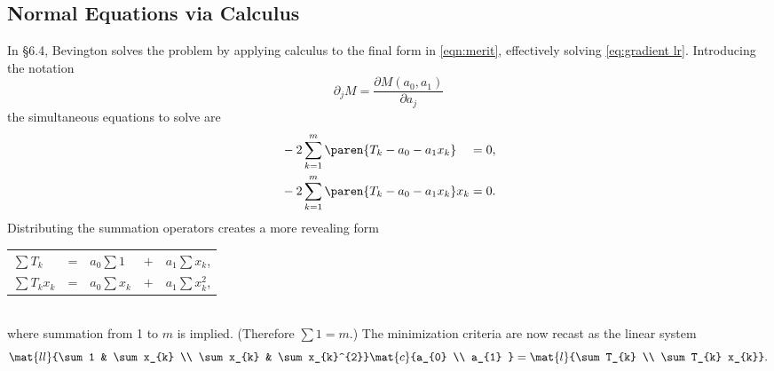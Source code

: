 \subsection{\label{ssec:Normal Equations via Calculus}Normal Equations via Calculus}  %
In \S 6.4, Bevington solves the problem by applying calculus to the final form in \eqref{eqn:merit}, effectively solving \eqref{eq:gradient lr}. Introducing the notation
  \begin{equation*}   %
       \partial_{j} M = \frac{\partial M(a_{0}, a_{1})}{\partial a_{j}}
  \end{equation*}
the simultaneous equations to solve are
\begin{equation*}
  \begin{split}
    &-2 \sum_{k=1}^{m} \paren{T_{k} - a_{0} - a_{1}x_{k}} \phantom{x_{k}} = 0, \\
    &-2 \sum_{k=1}^{m} \paren{T_{k} - a_{0} - a_{1}x_{k}} x_{k}  = 0.
  \end{split}
\end{equation*}
Distributing the summation operators creates a more revealing form  \\[-5pt]
  \begin{table}[h!]  %
    \begin{center}
      \begin{tabular}{lclcl}
         $\sum T_{k}$     & = & $a_{0} \sum 1$     & $ + $ & $a_{1} \sum x_{k}$, \\
         $\sum T_{k} x_{k}$ & = & $a_{0} \sum x_{k}$ & $ + $ & $a_{1} \sum x_{k}^{2}$, \\
      \end{tabular}
    \end{center}
  \end{table} \\[-5pt]
where summation from 1 to $m$ is implied. (Therefore $\sum 1 = m$.) The minimization criteria are
now recast as the linear system
  \begin{equation}   %
      \mat{ll}{\sum 1 & \sum x_{k} \\ \sum x_{k} & \sum x_{k}^{2}}
      \mat{c}{a_{0} \\ a_{1} } = 
      \mat{l}{\sum T_{k} \\ \sum T_{k} x_{k}}.
    \label{eq:modal matrix eq}
  \end{equation}

